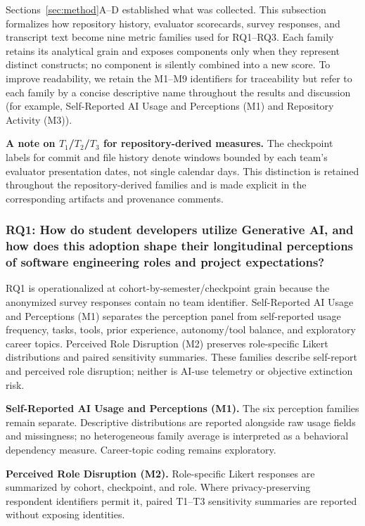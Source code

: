 Sections~\ref{sec:method}A--D established what was collected. This subsection
formalizes how repository history, evaluator scorecards, survey responses, and
transcript text become nine metric families used for RQ1--RQ3. Each family
retains its analytical grain and exposes components only when they represent
distinct constructs; no component is silently combined into a new score.
To improve readability, we retain the M1--M9 identifiers for traceability but
refer to each family by a concise descriptive name throughout the results and
discussion (for example, Self-Reported AI Usage and Perceptions (M1) and
Repository Activity (M3)).

\textbf{A note on $T_1$/$T_2$/$T_3$ for repository-derived measures.} The
checkpoint labels for commit and file history denote windows bounded by each
team's evaluator presentation dates, not single calendar days. This distinction
is retained throughout the repository-derived families and is made explicit in
the corresponding artifacts and provenance comments.

\subsubsection{RQ1: How do student developers utilize Generative AI, and how does this adoption shape their longitudinal perceptions of software engineering roles and project expectations?}

RQ1 is operationalized at cohort-by-semester/checkpoint grain because the
anonymized survey responses contain no team identifier. Self-Reported AI Usage
and Perceptions (M1) separates the
perception panel from self-reported usage frequency, tasks, tools, prior
experience, autonomy/tool balance, and exploratory career topics. Perceived
Role Disruption (M2) preserves
role-specific Likert distributions and paired sensitivity summaries. These
families describe self-report and perceived role disruption; neither is AI-use
telemetry or objective extinction risk.

\textbf{Self-Reported AI Usage and Perceptions (M1).} The six perception
families remain separate. Descriptive distributions are reported alongside raw
usage fields and missingness; no heterogeneous family average is interpreted as
a behavioral dependency measure. Career-topic coding remains exploratory.

\textbf{Perceived Role Disruption (M2).} Role-specific Likert responses are
summarized by cohort, checkpoint, and role. Where privacy-preserving respondent
identifiers permit it, paired T1--T3 sensitivity summaries are reported without
exposing identities.

